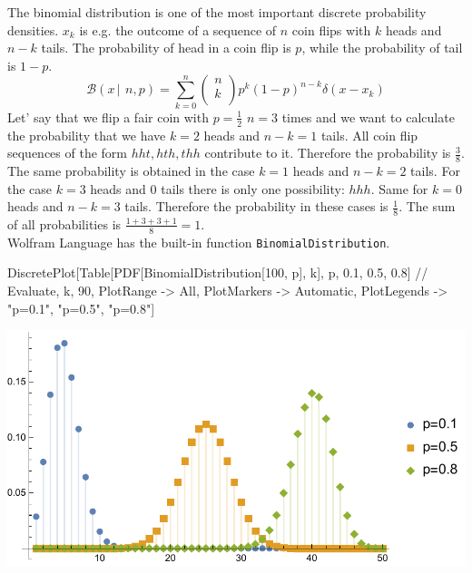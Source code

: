 \documentclass{tstextbook}
\begin{document}
\begin{example}
The binomial distribution is one of the most important discrete probability densities. $x_k$ is e.g. the outcome of a sequence of $n$ coin flips with $k$ heads and $n-k$ tails. The probability of head in a coin flip is $p$, while the probability of tail is $1-p$.  
  \begin{equation}
    \mathcal{B}(x\,\vert\,\ n,p)=\sum_{k=0}^n\left(\begin{array}{c}
n \\
k \\
\end{array}\right)p^k(1-p)^{n-k}\delta(x-x_k)
  \end{equation}
   Let' say that we flip a fair coin with $p=\frac{1}{2}$ $n=3$ times and we want to calculate the probability that we have $k=2$ heads and $n-k=1$ tails. All coin flip sequences of the form $hht,hth,thh$ contribute to it. Therefore the probability is $\frac{3}{8}$. The same probability is obtained in the case $k=1$ heads and $n-k=2$ tails. For the case $k=3$ heads and $0$ tails there is only one possibility: $hhh$. Same for $k=0$ heads and $n-k=3$ tails. Therefore the probability in these cases is $\frac{1}{8}$. The sum of all probabilities is $\frac{1+3+3+1}{8}=1$.\\

Wolfram Language has the built-in function \texttt{BinomialDistribution}.
\begin{mathematica}
DiscretePlot[Table[PDF[BinomialDistribution[100, p], k], 
             {p, {0.1, 0.5, 0.8}}] // Evaluate, 
             {k, 90}, PlotRange -> All, PlotMarkers -> Automatic, 
             PlotLegends -> {"p=0.1", "p=0.5", "p=0.8"}]
\end{mathematica}
\includegraphics[scale=0.9, center]{images/binomial_distribution.pdf} 
\end{example}
\end{document}
